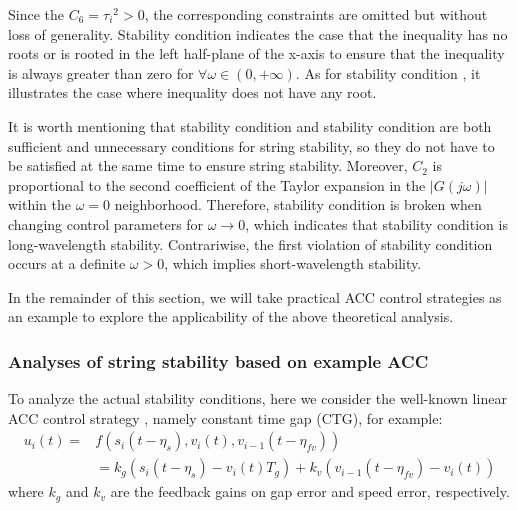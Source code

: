 \documentclass[journal]{IEEEtran}
\begin{document}
\begin{IEEEproof}
  Since the $C_6={\tau_i}^2>0$, the corresponding constraints are omitted but without loss of generality. Stability condition \uppercase\expandafter{} indicates the case that the inequality has no roots or is rooted in the left half-plane of the x-axis to ensure that the inequality is always greater than zero for $\forall\omega\in(0,+\infty)$. As for stability condition \uppercase\expandafter{}, it illustrates the case where inequality does not have any root.
\end{IEEEproof}

It is worth mentioning that stability condition \uppercase\expandafter{} and stability condition \uppercase\expandafter{} are both sufficient and unnecessary conditions for string stability, so they do not have to be satisfied at the same time to ensure string stability. Moreover, $C_{2}$ is proportional to the second coefficient of the Taylor expansion in the $\left|G\left(j\omega\right)\right|$ within the ${\omega}=0$ neighborhood. Therefore, stability condition \uppercase\expandafter{} is broken when changing control parameters for ${\omega}\rightarrow0$, which indicates that stability condition \uppercase\expandafter{} is long-wavelength stability. Contrariwise, the first violation of stability condition \uppercase\expandafter{} occurs at a definite ${\omega}>0$, which implies short-wavelength stability.

In the remainder of this section, we will take practical ACC control strategies as an example to explore the applicability of the above theoretical analysis.


\subsubsection{Analyses of string stability based on example ACC}
\label{Section 4.3.3}

To analyze the actual stability conditions, here we consider the well-known linear ACC control strategy \citep{Milanes2014,Navas2019}, namely constant time gap (CTG), for example:
\begin{equation}
  \begin{aligned}
    u_i\left(t\right)= & f\left(s_i\left(t-\eta_s\right),v_i\left(t\right),v_{i-1}\left(t-\eta_{fv}\right)\right)                                         \\
                       & =k_g\left(s_i\left(t-\eta_s\right)-v_i\left(t\right)T_g\right)+k_v\left(v_{i-1}\left(t-\eta_{fv}\right)-v_i\left(t\right)\right)
  \end{aligned}
  \label{Eq33}
\end{equation}
where $k_g$ and $k_v$ are the feedback gains on gap error and speed error, respectively.
\end{document}

